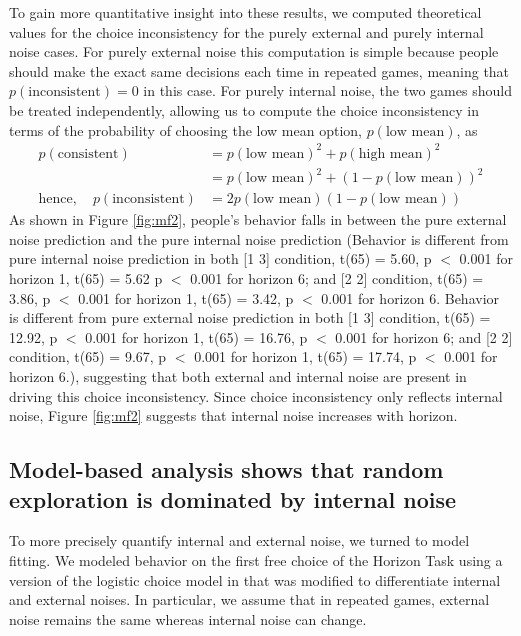\documentclass[12pt]{article}
\begin{document}
	To gain more quantitative insight into these results, we computed theoretical values for the choice inconsistency for the purely external and purely internal noise cases.  For purely external noise this computation is simple because people should make the exact same decisions each time in repeated games, meaning that $p(\mbox{inconsistent}) = 0$ in this case. For purely internal noise, the two games should be treated independently, allowing us to compute the choice inconsistency in terms of the probability of choosing the low mean option, $p(\mbox{low mean})$, as
	\begin{equation*}
	\begin{split}
	p(\mbox{consistent}) &= p(\mbox{low mean})^2 + p(\mbox{high mean})^2\\
	&= p(\mbox{low mean})^2 + (1-p(\mbox{low mean}))^2\\ 
	\mbox{hence},\quad p(\mbox{inconsistent}) &=  2 p(\mbox{low mean})(1-p(\mbox{low mean}))
	\end{split}
	\end{equation*}
	As shown in Figure  \ref{fig:mf2}, people's behavior falls in between the pure external noise prediction and the pure internal noise prediction (Behavior is different from pure internal noise prediction in both [1 3] condition, t(65) = 5.60, p $<$ 0.001 for horizon 1, t(65) = 5.62 p $<$ 0.001 for horizon 6; and [2 2] condition, t(65) = 3.86, p $<$ 0.001 for horizon 1, t(65) = 3.42, p $<$ 0.001 for horizon 6. Behavior is different from pure external noise prediction in both [1 3] condition, t(65) = 12.92, p $<$ 0.001 for horizon 1, t(65) = 16.76, p $<$ 0.001 for horizon 6; and [2 2] condition, t(65) = 9.67, p $<$ 0.001 for horizon 1, t(65) = 17.74, p $<$ 0.001 for horizon 6.), suggesting that both external and internal noise are present in driving this choice inconsistency. Since choice inconsistency only reflects internal noise, Figure \ref{fig:mf2} suggests that internal noise increases with horizon.
	
	\subsection*{Model-based analysis shows that random exploration is dominated by internal noise}
	
	To more precisely quantify internal and external noise, we turned to model fitting. We modeled behavior on the first free choice of the Horizon Task using a version of the logistic choice model in \citep{wilson2014} that was modified to differentiate internal and external noises. In particular, we assume that in repeated games, external noise remains the same whereas internal noise can change. 
	
\end{document}
